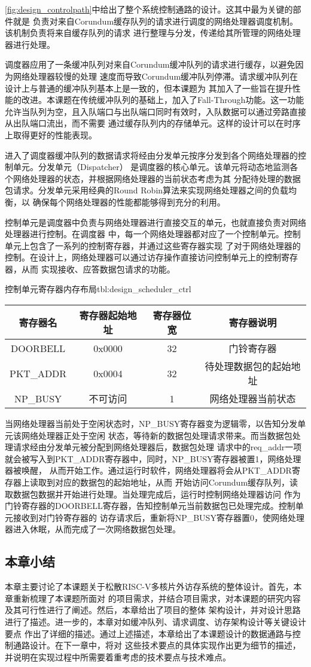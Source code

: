 \autoref{fig:design_controlpath}中给出了整个系统控制通路的设计。这其中最为关键的部件就是
负责对来自Corundum缓存队列的请求进行调度的网络处理器调度机制。该机制负责将来自缓存队列的请求
进行整理与分发，传递给其所管理的网络处理器进行处理。

调度器应用了一条缓冲队列对来自Corundum缓冲队列的请求进行缓存，以避免因为网络处理器较慢的处理
速度而导致Corundum缓冲队列停滞。请求缓冲队列在设计上与普通的缓冲队列基本上是一致的，但本课题为
其加入了一些旨在提升性能的改进。本课题在传统缓冲队列的基础上，加入了Fall-Through功能。这一功能
允许当队列为空，且入队端口与出队端口同时有效时，入队数据可以通过旁路直接从出队端口流出，而不需要
通过缓存队列内的存储单元。这样的设计可以在时序上取得更好的性能表现。

进入了调度器缓冲队列的数据请求将经由分发单元按序分发到各个网络处理器的控制单元。分发单元（Dispatcher）
是调度器的核心单元。该单元将动态地监测各个网络处理器的状态，并根据网络处理器的当前状态考虑为其
分配待处理的数据包请求。分发单元采用经典的Round Robin算法来实现网络处理器之间的负载均衡，以
确保每个网络处理器的性能都能够得到充分的利用。

控制单元是调度器中负责与网络处理器进行直接交互的单元，也就直接负责对网络处理器进行控制。在调度器
中，每一个网络处理器都对应了一个控制单元。控制单元上包含了一系列的控制寄存器，并通过这些寄存器实现
了对于网络处理器的控制。在设计上，网络处理器可以通过访存操作直接访问控制单元上的控制寄存器，从而
实现接收、应答数据包请求的功能。

\begin{generaltab}{控制单元寄存器内存布局}{tbl:design_scheduler_ctrl}
  \begin{tabular}{cccc}
    \toprule
    寄存器名 & 寄存器起始地址 & 寄存器位宽 & 寄存器说明 \\
    \midrule
    DOORBELL & 0x0000 & 32 & 门铃寄存器 \\
    PKT\_ADDR & 0x0004 & 32 & 待处理数据包的起始地址 \\
    \midrule
    NP\_BUSY & 不可访问 & 1 & 网络处理器当前状态 \\
    \bottomrule
  \end{tabular}
\end{generaltab}

当网络处理器当前处于空闲状态时，NP\_BUSY寄存器变为逻辑零，以告知分发单元该网络处理器正处于空闲
状态，等待新的数据包处理请求带来。而当数据包处理请求经由分发单元被分配到网络处理器后，数据包处理
请求中的req\_addr一项就会被写入到PKT\_ADDR寄存器中，同时，NP\_BUSY寄存器被置1，网络处理器被唤醒，
从而开始工作。通过运行时软件，网络处理器将会从PKT\_ADDR寄存器上读取到对应的数据包的起始地址，从而
开始访问Corundum缓存队列，读取数据包数据并开始进行处理。当处理完成后，运行时控制网络处理器访问
作为门铃寄存器的DOORBELL寄存器，告知控制单元当前数据包已处理完成。控制单元接收到对门铃寄存器的
访存请求后，重新将NP\_BUSY寄存器置0，使网络处理器进入休眠，从而完成了一次网络数据包处理。

\subsection{本章小结}

本章主要讨论了本课题关于松散RISC-V多核片外访存系统的整体设计。首先，本章重新梳理了本课题所面对
的项目需求，并结合项目需求，对本课题的研究内容及其可行性进行了阐述。然后，本章给出了项目的整体
架构设计，并对设计思路进行了描述。进一步的，本章对如缓冲队列、请求调度、访存架构设计等关键设计要点
作出了详细的描述。通过上述描述，本章给出了本课题设计的数据通路与控制通路设计。在下一章中，将对
这些技术要点的具体实现作出更为细节的描述，并说明在实现过程中所需要着重考虑的技术要点与技术难点。
